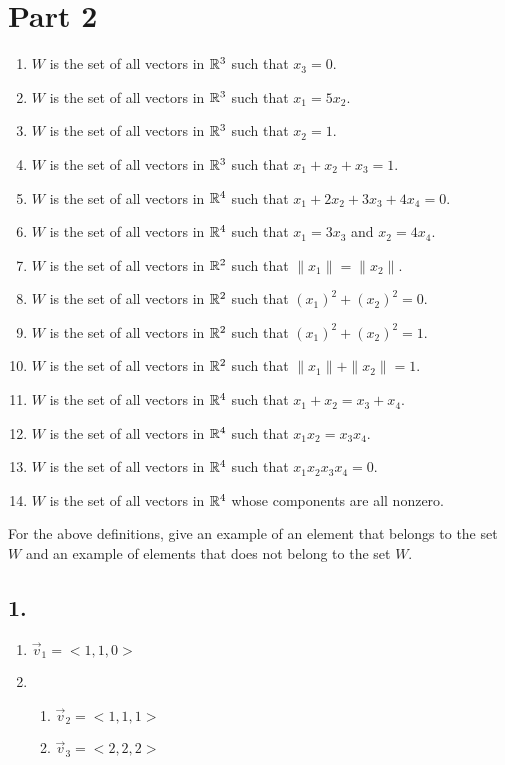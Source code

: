 \documentclass{article}
\begin{document}
\section{Part 2}
\begin{enumerate}[label=\textbf{\arabic*.}]
	\item $ W $ is the set of all vectors in $ \mathbb{R}^{3} $ such that $ x_3 = 0 $.
	\item $ W $ is the set of all vectors in $ \mathbb{R}^{3} $ such that $ x_1 = 5x_2 $.
	\item $ W $ is the set of all vectors in $ \mathbb{R}^{3} $ such that $ x_2 = 1 $.
	\item $ W $ is the set of all vectors in $ \mathbb{R}^{3} $ such that $ x_1 + x_2 + x_3 = 1 $.
	\item $ W $ is the set of all vectors in $ \mathbb{R}^{4} $ such that $ x_1 + 2x_2 + 3x_3 + 4x_4 = 0 $.
	\item $ W $ is the set of all vectors in $ \mathbb{R}^{4} $ such that $ x_1 = 3x_3 $ and $ x_2 = 4x_4 $.
	\item $ W $ is the set of all vectors in $ \mathbb{R}^{2} $ such that $ \|x_1\| = \|x_2 \|$.
	\item $ W $ is the set of all vectors in $ \mathbb{R}^{2} $ such that $ (x_1)^2 + (x_2)^2 = 0 $.
	\item $ W $ is the set of all vectors in $ \mathbb{R}^{2} $ such that $ (x_1)^2 + (x_2)^2 = 1 $.
	\item $ W $ is the set of all vectors in $ \mathbb{R}^{2} $ such that $ \|x_1\| + \|x_2\| = 1 $.
	\item $ W $ is the set of all vectors in $ \mathbb{R}^{4} $ such that $ x_1 + x_2 = x_3 + x_4 $.
	\item $ W $ is the set of all vectors in $ \mathbb{R}^{4} $ such that $ x_1x_2 = x_3x_4 $.
	\item $ W $ is the set of all vectors in $ \mathbb{R}^{4} $ such that $ x_1x_2x_3x_4 = 0 $.
	\item $ W $ is the set of all vectors in $ \mathbb{R}^{4} $ whose components are all nonzero.
\end{enumerate}
For the above definitions, give an example of an element that belongs to the set $ W $ and an example of elements that does not belong to the set $ W $.

\subsection{1.}
\begin{enumerate}[label=\textbf{\alph*.}]
	\item $ \vec{v}_1 = <1, 1, 0> $
	\item
		\begin{enumerate}[label=\textbf{\arabic*.}]
			\item $ \vec{v}_2 = <1, 1, 1> $
			\item $ \vec{v}_3 = <2, 2, 2> $
		\end{enumerate}
\end{enumerate}
\end{document}
